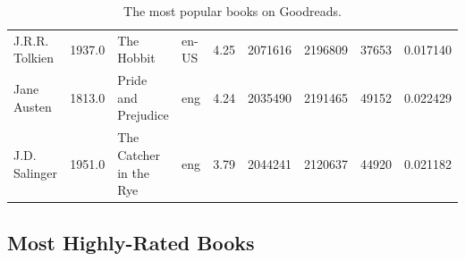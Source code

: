 \documentclass[handout]{beamer}
\begin{document}
\begin{frame}
\begin{table}
\begin{tabular}{lHlHHHHHZ}
              J.R.R. Tolkien &                     1937.0 &                                         The Hobbit &         en-US &            4.25 &        2071616 &             2196809 &                    37653 &       0.017140 \\
                 Jane Austen &                     1813.0 &                                Pride and Prejudice &           eng &            4.24 &        2035490 &             2191465 &                    49152 &       0.022429 \\
               J.D. Salinger &                     1951.0 &                             The Catcher in the Rye &           eng &            3.79 &        2044241 &             2120637 &                    44920 &       0.021182 \\
\bottomrule
\end{tabular}
    \caption[Most Rated Books]{The most popular books on Goodreads.}
     \label{tbl:most-rated-books}
\end{table}


\end{frame}

\subsection{Most Highly-Rated Books}\label{most-highly-rated-books}
\end{document}
